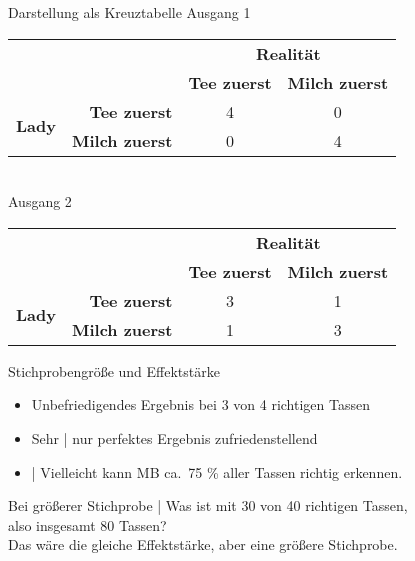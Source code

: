 \begin{frame}
  {Darstellung als Kreuztabelle}
  \centering 
  \alert{Ausgang 1}\\
  \begin{tabular}[h]{rrcc}
    \toprule
    && \multicolumn{2}{c}{\textbf{Realität}} \\
    && \textbf{Tee zuerst} & \textbf{Milch zuerst} \\
    \midrule
    \multirow{2}{*}{\textbf{Lady}} & \textbf{Tee zuerst} & 4 & 0 \\
    & \textbf{Milch zuerst} & 0 & 4 \\
    \bottomrule
  \end{tabular}\\
  \vspace{2\baselineskip}
  \alert{Ausgang 2}\\
  \begin{tabular}[h]{rrcc}
    \toprule
    && \multicolumn{2}{c}{\textbf{Realität}} \\
    && \textbf{Tee zuerst} & \textbf{Milch zuerst} \\
    \midrule
    \multirow{2}{*}{\textbf{Lady}} & \textbf{Tee zuerst} & 3 & 1 \\
    & \textbf{Milch zuerst} & 1 & 3 \\
    \bottomrule
  \end{tabular}
\end{frame}

\begin{frame}
  {Stichprobengröße und Effektstärke}
  \begin{itemize}[<+->]
    \item Unbefriedigendes Ergebnis bei 3 von 4 richtigen Tassen
      \Halbzeile
    \item Sehr  | nur perfektes Ergebnis zufriedenstellend
    \item {} | Vielleicht kann MB ca.\ 75 \% aller Tassen richtig erkennen.
  \end{itemize}
  \Zeile
  \centering 
  Bei größerer Stichprobe | Was ist mit \alert{30 von 40 richtigen Tassen},\\also insgesamt 80 Tassen?\\
  \Halbzeile
  Das wäre die \alert{gleiche Effektstärke}, aber eine \alert{größere Stichprobe}.
\end{frame}

